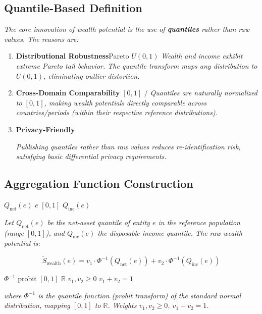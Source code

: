 \documentclass[11pt,a4paper]{article}
\theoremstyle{definition}
\newcommand{\R}{\mathbb{R}}
\begin{document}
\subsection{ Quantile-Based Definition}

\textbf{}

\medskip
\noindent\textit{The core innovation of wealth potential is the use of \textbf{quantiles} rather than raw values. The reasons are:}

\begin{enumerate}[leftmargin=*]
    \item \textbf{ Distributional Robustness}Pareto
     $U(0,1)$
    \textit{Wealth and income exhibit extreme Pareto tail behavior. The quantile transform maps any distribution to $U(0,1)$, eliminating outlier distortion.}
    
    \item \textbf{ Cross-Domain Comparability} $[0, 1]$
    /
    \textit{Quantiles are naturally normalized to $[0,1]$, making wealth potentials directly comparable across countries/periods (within their respective reference distributions).}
    
    \item \textbf{ Privacy-Friendly}
    
    \textit{Publishing quantiles rather than raw values reduces re-identification risk, satisfying basic differential privacy requirements.}
\end{enumerate}

\subsection{ Aggregation Function Construction}

 $Q_{\text{net}}(e)$  $e$  $[0, 1]$
$Q_{\text{inc}}(e)$ 

\medskip
\noindent\textit{Let $Q_{\text{net}}(e)$ be the net-asset quantile of entity $e$ in the reference population (range $[0, 1]$), and $Q_{\text{inc}}(e)$ the disposable-income quantile. The raw wealth potential is:}

\begin{equation}
    \tilde{S}_{\text{wealth}}(e) = v_1 \cdot \Phi^{-1}(Q_{\text{net}}(e)) + v_2 \cdot \Phi^{-1}(Q_{\text{inc}}(e))
    \label{eq:wealth-raw}
\end{equation}

 $\Phi^{-1}$ probit $[0, 1]$  $\R$
 $v_1, v_2 \geq 0$  $v_1 + v_2 = 1$

\medskip
\noindent\textit{where $\Phi^{-1}$ is the quantile function (probit transform) of the standard normal distribution, mapping $[0,1]$ to $\R$. Weights $v_1, v_2 \geq 0$, $v_1+v_2=1$.}
\end{document}

